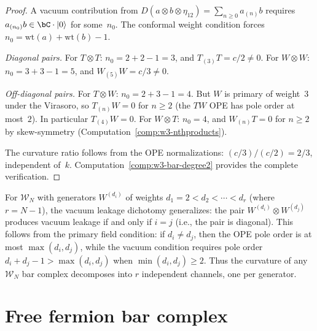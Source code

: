 \begin{proof}
A vacuum contribution from $D(a \otimes b \otimes \eta_{12})
= \sum_{n \geq 0} a_{(n)}b$ requires $a_{(n_0)}b \in \bC \cdot |0\rangle$
for some~$n_0$.  The conformal weight condition forces
$n_0 = \mathrm{wt}(a) + \mathrm{wt}(b) - 1$.

\emph{Diagonal pairs.}
For $T \otimes T$: $n_0 = 2 + 2 - 1 = 3$, and $T_{(3)}T = c/2 \neq 0$.
For $W \otimes W$: $n_0 = 3 + 3 - 1 = 5$, and $W_{(5)}W = c/3 \neq 0$.

\emph{Off-diagonal pairs.}
For $T \otimes W$: $n_0 = 2 + 3 - 1 = 4$.  But $W$ is primary of
weight~$3$ under the Virasoro, so $T_{(n)}W = 0$ for $n \geq 2$
(the $TW$ OPE has pole order at most~$2$).  In particular $T_{(4)}W = 0$.
For $W \otimes T$: $n_0 = 4$, and $W_{(n)}T = 0$ for $n \geq 2$ by
skew-symmetry (Computation~\ref{comp:w3-nthproducts}).

The curvature ratio follows from the OPE normalizations:
$(c/3)/(c/2) = 2/3$, independent of~$k$.
Computation~\ref{comp:w3-bar-degree2} provides the complete verification.
\end{proof}

\begin{remark}\label{rem:wn-vacuum-channels}
For $\mathcal{W}_N$ with generators $W^{(d_i)}$ of weights $d_1 = 2 < d_2 < \cdots < d_r$
(where $r = N-1$), the vacuum leakage dichotomy generalizes: the pair
$W^{(d_i)} \otimes W^{(d_j)}$ produces vacuum leakage if and only if
$i = j$ (i.e., the pair is diagonal).
This follows from the primary field condition: if $d_i \neq d_j$,
then the OPE pole order is at most $\max(d_i, d_j)$, while the vacuum
condition requires pole order $d_i + d_j - 1 > \max(d_i, d_j)$ when
$\min(d_i, d_j) \geq 2$.  Thus the curvature of any $\mathcal{W}_N$
bar complex decomposes into $r$ independent channels, one per generator.
\end{remark}



\section{Free fermion bar complex}
\label{sec:fermion-bar-details}

